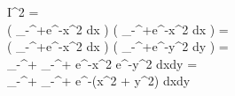 I^2 =\\

\left(
\int_{-\infty}^{+\infty}e^{-x^2} dx
\right)
\cdot
\left(
\int_{-\infty}^{+\infty}e^{-x^2} dx
\right) =\\

\left(
\int_{-\infty}^{+\infty}e^{-x^2} dx
\right)
\cdot
\left(
\int_{-\infty}^{+\infty}e^{-y^2} dy
\right) =\\

\int_{-\infty}^{+\infty} \int_{-\infty}^{+\infty}
e^{-x^2} \cdot e^{-y^2} dxdy =\\

\int_{-\infty}^{+\infty} \int_{-\infty}^{+\infty}
e^{-(x^2 + y^2)} dxdy
